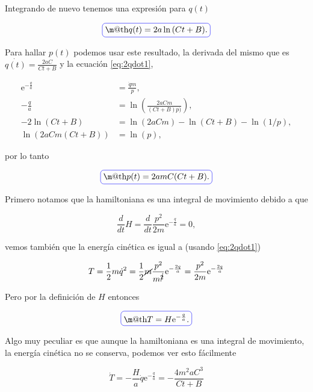 \documentclass[a4paper,10pt]{article}
\makeatletter
\numberwithin{equation}{section}
\newcommand*{\boxcolor}{blue}
\renewcommand{\boxed}[1]{\textcolor{\boxcolor}{%
\tikz[baseline={([yshift=-1ex]current bounding box.center)}] \node [rectangle, minimum width=1ex,rounded corners,draw] {\normalcolor\m@th$\displaystyle#1$};}}
\newcommand{\euler}{\mathrm{e}}
\makeatother
\begin{document}
Integrando de nuevo tenemos una expresión para $q(t)$

\begin{equation}
\boxed{ q(t) = 2a\ln{(Ct + B)}.}
\end{equation}

Para hallar $p(t)$ podemos usar este resultado, la derivada del mismo que 
es $\dot{q(t)} = \frac{2aC}{Ct+B}$ y la ecuación \eqref{eq:2qdot1},

\begin{align*}
 \euler^{-\frac{q}{a}} &= \frac{\dot{q}m}{p}, \\
 -\frac{q}{a} &= \ln{\left(\frac{2aCm}{(Ct+B)p)}\right)}, \\
 -2\ln(Ct + B) &= \ln(2aCm) - \ln(Ct + B) - \ln(1/p), \\
 \ln(2aCm(Ct + B)) &= \ln(p),
\end{align*}

por lo tanto

\begin{equation}
 \boxed{p(t) = 2amC(Ct+B).}
\end{equation}

Primero notamos que la hamiltoniana es una integral de movimiento debido a que 

\begin{equation}
 \frac{d}{dt}H =  \frac{d}{dt} \frac{p^2}{2m}\euler^{-\frac{q}{a}} = 0,
\end{equation}

vemos también que la energía cinética es igual a (usando \eqref{eq:2qdot1})

\begin{equation}
 T = \frac{1}{2}m\dot{q}^2 = \frac{1}{2}\cancel{m}\frac{p^2}{m^{\cancel{2}}}\euler^{-\frac{2q}{a}} = 
 \frac{p^2}{2m}\euler^{-\frac{2q}{a}}
\end{equation}

Pero por la definición de $H$ entonces 

\begin{equation}
 \boxed{T = H\euler^{-\frac{q}{a}}.}
\end{equation}

Algo muy peculiar es que aunque la hamiltoniana es una integral de movimiento, 
la energía cinética no se conserva, podemos ver esto fácilmente

\begin{equation}
 \dot{T} = - \frac{H}{a}\dot{q}\euler^{-\frac{q}{a}} = - \frac{4m^2aC^3}{Ct + B}
\end{equation}
\end{document}
